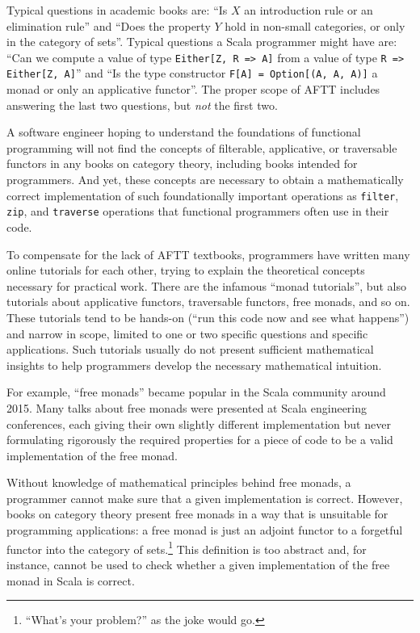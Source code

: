 Typical questions in academic books are: ``Is $X$ an introduction
rule or an elimination rule'' and ``Does the property $Y$ hold
in non-small categories, or only in the category of sets''. Typical
questions a Scala programmer might have are: ``Can we compute a value
of type \lstinline!Either[Z, R => A]! from a value of type \lstinline!R => Either[Z, A]!''
and ``Is the type constructor \lstinline!F[A] = Option[(A, A, A)]!
a monad or only an applicative functor''. The proper scope of AFTT
includes answering the last two questions, but \emph{not} the first
two.

A software engineer hoping to understand the foundations of functional
programming will not find the concepts of filterable, applicative,
or traversable functors in any books on category theory, including
books intended for programmers. And yet, these concepts are necessary
to obtain a mathematically correct implementation of such foundationally
important operations as \lstinline!filter!, \lstinline!zip!, and
\lstinline!traverse! \textendash{} operations that functional programmers
often use in their code.

To compensate for the lack of AFTT textbooks, programmers have written
many online tutorials for each other, trying to explain the theoretical
concepts necessary for practical work. There are the infamous ``monad
tutorials'', but also tutorials about applicative functors, traversable
functors, free monads, and so on. These tutorials tend to be hands-on
(``run this code now and see what happens'') and narrow in scope,
limited to one or two specific questions and specific applications.
Such tutorials usually do not present sufficient mathematical insights
to help programmers develop the necessary mathematical intuition.

For example, ``free monads'' became popular in the Scala community
around 2015. Many talks about free monads were presented at Scala
engineering conferences, each giving their own slightly different
implementation but never formulating rigorously the required properties
for a piece of code to be a valid implementation of the free monad.

Without knowledge of mathematical principles behind free monads, a
programmer cannot make sure that a given implementation is correct.
However, books on category theory present free monads in a way that
is unsuitable for programming applications: a free monad is just an
adjoint functor to a forgetful functor into the category of sets.\footnote{``What's your problem?'' as the joke would go.}
This definition is too abstract and, for instance, cannot be used
to check whether a given implementation of the free monad in Scala
is correct.

